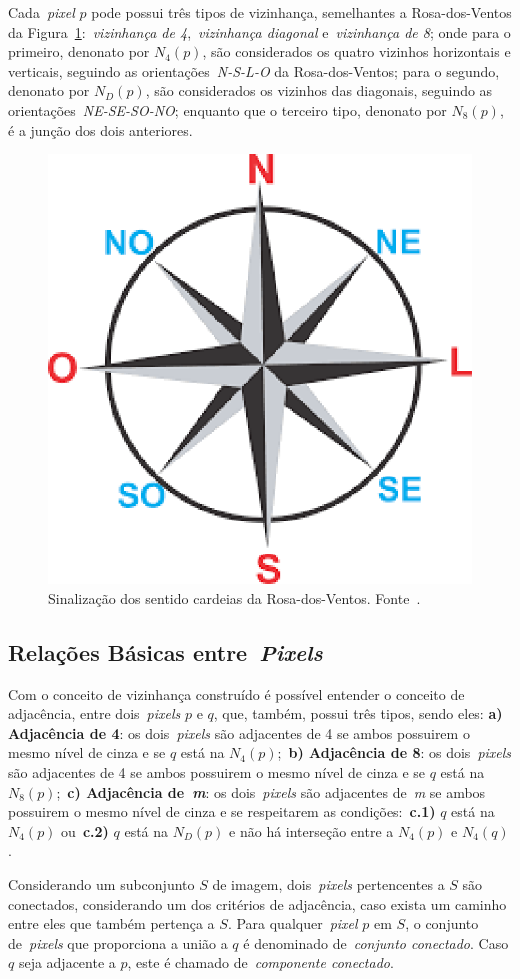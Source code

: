 \documentclass[conference]{Trabalho_Final}
\begin{document}
Cada~\textit{pixel} $p$ pode possui tr\^es tipos de vizinhan\c{c}a, semelhantes a Rosa-dos-Ventos da Figura~\ref{fig:rosadosventos}:~\textit{vizinhan\c{c}a de 4},~\textit{vizinhan\c{c}a diagonal} e~\textit{vizinhan\c{c}a de 8}; onde para o primeiro, denonato por $N_4(p)$, s\~ao considerados os quatro vizinhos horizontais e verticais, seguindo as orienta\c{c}\~oes~\textit{N-S-L-O} da Rosa-dos-Ventos; para o segundo, denonato por $N_D(p)$, s\~ao considerados os vizinhos das diagonais, seguindo as orienta\c{c}\~oes~\textit{NE-SE-SO-NO}; enquanto que o terceiro tipo, denonato por $N_8(p)$, \'e a jun\c{c}\~ao dos dois anteriores.

\begin{figure}[!t]
  \centering
  \includegraphics[width = 3 cm]{rosadosventos}
  \caption{Sinaliza\c{c}\~ao dos sentido cardeias da Rosa-dos-Ventos. Fonte~\cite{rosadosventos}.}
  \label{fig:rosadosventos}
\end{figure}

\subsection{Rela\c{c}\~oes B\'asicas entre~\textit{Pixels}}
  \label{subsec:relacaopix}
Com o conceito de vizinhan\c{c}a constru\'ido \'e poss\'ivel entender o conceito de adjac\^encia, entre dois~\textit{pixels} $p$ e $q$, que, tamb\'em, possui tr\^es tipos, sendo eles: \textbf{a) Adjac\^encia de 4}: os dois~\textit{pixels} s\~ao adjacentes de 4 se ambos possuirem o mesmo n\'ivel de cinza e se $q$ est\'a na $N_4(p)$;~\textbf{b) Adjac\^encia de 8}: os dois~\textit{pixels} s\~ao adjacentes de 4 se ambos possuirem o mesmo n\'ivel de cinza e se $q$ est\'a na $N_8(p)$;~\textbf{c) Adjac\^encia de~\textit{m}}: os dois~\textit{pixels} s\~ao adjacentes de~\textit{m} se ambos possuirem o mesmo n\'ivel de cinza e se respeitarem as condi\c{c}\~oes:~\textbf{c.1)} $q$ est\'a na $N_4(p)$ ou~\textbf{c.2)} $q$ est\'a na $N_D(p)$ e n\~ao h\'a interse\c{c}\~ao entre a $N_4(p)$ e $N_4(q)$.

Considerando um subconjunto $S$ de imagem, dois~\textit{pixels} pertencentes a $S$ s\~ao conectados, considerando um dos crit\'erios de adjac\^encia, caso exista um caminho entre eles que tamb\'em perten\c{c}a a $S$. Para qualquer~\textit{pixel} $p$ em $S$, o conjunto de~\textit{pixels} que proporciona a uni\~ao a $q$ \'e denominado de~\textit{conjunto conectado}. Caso $q$ seja adjacente a $p$, este \'e chamado de~\textit{componente conectado}.
\end{document}
